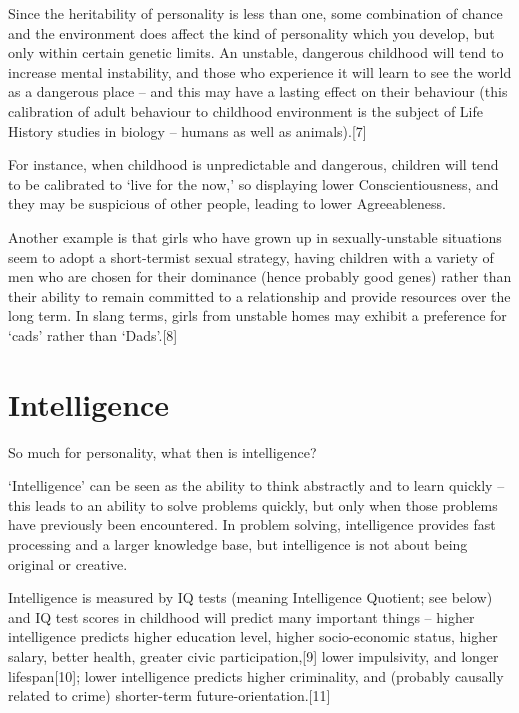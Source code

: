 \documentclass[
]{book}
\begin{document}
Since the heritability of personality is less than one, some combination of chance and the environment does affect the kind of personality which you develop, but only within certain genetic limits. An unstable, dangerous childhood will tend to increase mental instability, and those who experience it will learn to see the world as a dangerous place -- and this may have a lasting effect on their behaviour (this calibration of adult behaviour to childhood environment is the subject of Life History studies in biology -- humans as well as animals).{[}7{]}

For instance, when childhood is unpredictable and dangerous, children will tend to be calibrated to `live for the now,' so displaying lower Conscientiousness, and they may be suspicious of other people, leading to lower Agreeableness.

Another example is that girls who have grown up in sexually-unstable situations seem to adopt a short-termist sexual strategy, having children with a variety of men who are chosen for their dominance (hence probably good genes) rather than their ability to remain committed to a relationship and provide resources over the long term. In slang terms, girls from unstable homes may exhibit a preference for `cads' rather than `Dads'.{[}8{]}

\hypertarget{intelligence}{%
\section{Intelligence}\label{intelligence}}

So much for personality, what then is intelligence?

`Intelligence' can be seen as the ability to think abstractly and to learn quickly -- this leads to an ability to solve problems quickly, but only when those problems have previously been encountered. In problem solving, intelligence provides fast processing and a larger knowledge base, but intelligence is not about being original or creative.

Intelligence is measured by IQ tests (meaning Intelligence Quotient; see below) and IQ test scores in childhood will predict many important things -- higher intelligence predicts higher education level, higher socio-economic status, higher salary, better health, greater civic participation,{[}9{]} lower impulsivity, and longer lifespan{[}10{]}; lower intelligence predicts higher criminality, and (probably causally related to crime) shorter-term future-orientation.{[}11{]}
\end{document}

